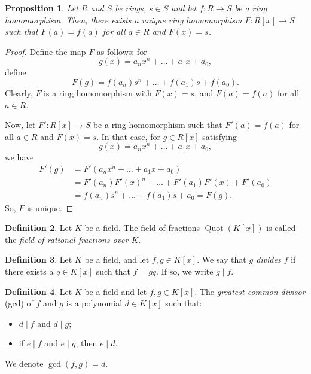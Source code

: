 \documentclass[a4paper, openany]{memoir}
\theoremstyle{definition}
\newtheorem{definition}{Definition}[section]
\theoremstyle{plain}
\newtheorem{proposition}[definition]{Proposition}
\begin{document}
    \begin{proposition}
        Let $R$ and $S$ be rings, $s \in S$ and let $f \colon R \to S$ be a ring homomorphism. Then, there exists a unique ring homomorphism $F \colon R[x] \to S$ such that $F(a) = f(a)$ for all $a \in R$ and $F(x) = s$.
    \end{proposition}
    \begin{proof}
        Define the map $F$ as follows: for 
        \[g(x) = a_n x^n + \dots + a_1 x + a_0,\]
        define 
        \[F(g) = f(a_n) s^n + \dots + f(a_1) s + f(a_0).\]
        Clearly, $F$ is a ring homomorphism with $F(x) = s$, and $F(a) = f(a)$ for all $a \in R$.

        Now, let $F' \colon R[x] \to S$ be a ring homomorphism such that $F'(a) = f(a)$ for all $a \in R$ and $F(x) = s$. In that case, for $g \in R[x]$ satisfying
        \[g(x) = a_n x^n + \dots + a_1 x + a_0,\]
        we have
        \begin{align*}
            F'(g) &= F'(a_n x^n + \dots + a_1 x + a_0) \\
            &= F'(a_n) F'(x)^n + \dots + F'(a_1) F'(x) + F'(a_0) \\
            &= f(a_n) s^n + \dots + f(a_1) s + a_0 = F(g).
        \end{align*}
        So, $F$ is unique.
    \end{proof}

    \begin{definition}
        Let $K$ be a field. The field of fractions $\operatorname{Quot}(K[x])$ is called the \emph{field of rational fractions over $K$}.
    \end{definition}

    \begin{definition}
        Let $K$ be a field, and let $f, g \in K[x]$. We say that \emph{$g$ divides $f$} if there exists a $q \in K[x]$ such that $f = gq$. If so, we write $g \mid f$.
    \end{definition}

    \begin{definition}
        Let $K$ be a field and let $f, g \in K[x]$. The \emph{greatest common divisor} (gcd) of $f$ and $g$ is a polynomial $d \in K[x]$ such that:
        \begin{itemize}
            \item $d \mid f$ and $d \mid g$;
            \item if $e \mid f$ and $e \mid g$, then $e \mid d$.
        \end{itemize}
        We denote $\gcd(f, g) = d$.
    \end{definition}
\end{document}

